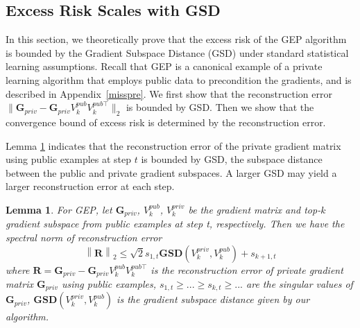\documentclass[11pt]{article}
\newtheorem{lemma}{Lemma}
\begin{document}
\subsection{Excess Risk Scales with GSD}
\label{riskanalysis}
In this section, we theoretically prove that the excess risk of the GEP algorithm~\cite{donot} is bounded by the Gradient Subspace Distance (GSD) under standard statistical learning assumptions. 
Recall that GEP is a canonical example of a private learning algorithm that employs public data to precondition the gradients, and is described in Appendix~\ref{misspre}.
We first show that the reconstruction error $\|\mathbf{G}_{p r i v}-\mathbf{G}_{p r i v} V_k^{p u b} V_k^{p u b \top} \|_2$ is bounded by GSD. Then we show that the convergence bound of excess risk is determined by the reconstruction error.



Lemma \ref{lemma1} indicates that the reconstruction error of the private gradient matrix using public examples at step $t$ is bounded by GSD, the subspace distance between the public and private gradient subspaces. A larger GSD may yield a larger reconstruction error at each step.
\begin{lemma}
\label{lemma1}
For GEP, let $\mathbf{G}_{p r i v}$, $V_k^{p u b}$, $V_k^{priv}$ be the gradient matrix and top-$k$ gradient subspace from public examples at step t, respectively. Then we have the spectral norm of reconstruction error
\begin{equation}
    \left\| \mathbf{R} \right\|_2 \le \sqrt{2}s_{1, t}\mathbf{GSD}(V_k^{priv}, V_k^{p u b}) + s_{k + 1, t}
\end{equation}
where $\mathbf{R} = \mathbf{G}_{p r i v}-\mathbf{G}_{p r i v} V_k^{p u b} V_k^{p u b \top}$ is the reconstruction error of private gradient matrix $\mathbf{G}_{p r i v}$ using public examples, $s_{1, t} \ge ...\ge s_{k, t} \ge...$ are the singular values of $\mathbf{G}_{p r i v}$, $\mathbf{GSD}(V_k^{priv}, V_k^{p u b})$ is the gradient subspace distance given by our algorithm.
\end{lemma}
\end{document}
